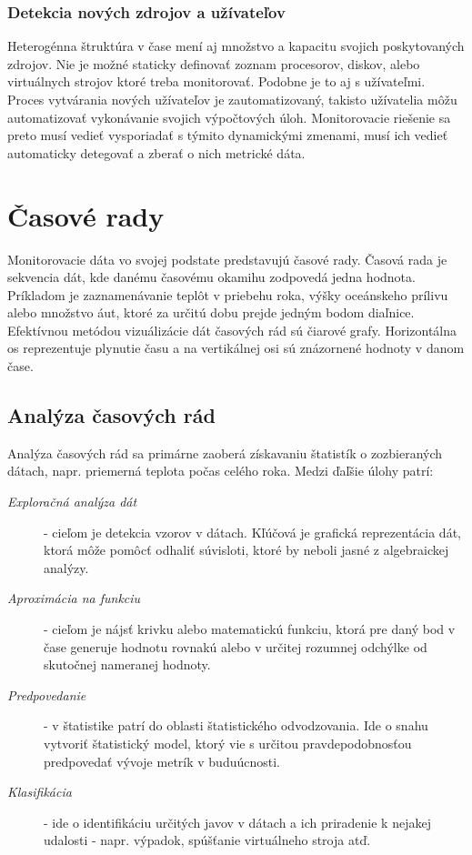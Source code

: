 \documentclass[12pt,twoside,color,cover,table]{fithesis3}
\begin{document}
\subsubsection{Detekcia nových zdrojov a užívateľov}
Heterogénna štruktúra v čase mení aj množstvo a kapacitu svojich poskytovaných zdrojov. Nie je možné staticky definovať zoznam procesorov, diskov, alebo virtuálnych strojov ktoré treba monitorovať. Podobne je to aj s užívateľmi. Proces
vytvárania nových užívateľov je zautomatizovaný, takisto užívatelia môžu automatizovať vykonávanie svojich výpočtových úloh. Monitorovacie riešenie sa preto musí vedieť vysporiadať s týmito dynamickými zmenami, musí ich vedieť 
automaticky detegovať a zberať o nich metrické dáta.

\section{Časové rady}
Monitorovacie dáta vo svojej podstate predstavujú časové rady.
Časová rada je sekvencia dát, kde danému časovému okamihu zodpovedá jedna hodnota. Príkladom je zaznamenávanie teplôt v priebehu roka, výšky oceánskeho prílivu alebo množstvo áut, ktoré za určitú dobu
prejde jedným bodom diaľnice. Efektívnou metódou vizuálizácie dát časových rád sú čiarové grafy. Horizontálna os reprezentuje plynutie času a na vertikálnej osi sú znázornené hodnoty v danom čase.

\subsection{Analýza časových rád}
Analýza časových rád sa primárne zaoberá získavaniu štatistík o zozbieraných dátach, napr. priemerná teplota počas celého roka. Medzi ďaľšie úlohy patrí:
\begin{description}
\item[\emph{Exploračná analýza dát}] - cieľom je detekcia vzorov v dátach. Kľúčová je grafická reprezentácia dát, ktorá môže pomôcť odhaliť súvisloti, ktoré by neboli jasné z algebraickej analýzy.%
\item[\emph{Aproximácia na funkciu}] - cieľom je nájsť krivku alebo matematickú funkciu, ktorá pre daný bod v čase generuje hodnotu rovnakú alebo v určitej rozumnej odchýlke od skutočnej nameranej hodnoty.
\item[\emph{Predpovedanie}] - v štatistike patrí do oblasti štatistického odvodzovania. Ide o snahu vytvoriť štatistický model, ktorý vie s určitou pravdepodobnosťou predpovedať vývoje metrík v buduúcnosti.
\item[\emph{Klasifikácia}] - ide o identifikáciu určitých javov v dátach a ich priradenie k nejakej udalosti - napr. výpadok, spúšťanie virtuálneho stroja atď.                               
\end{description}
\end{document}

